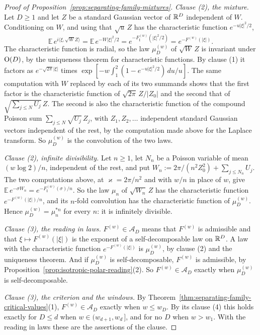 \begin{proof}[Proof of Proposition~\ref{prop:separating-family-mixtures}]
\emph{Clause (2), the mixture.} Let $D \ge 1$ and let $Z$ be a standard Gaussian vector of
$\mathbb{R}^D$ independent of $W$. Conditioning on $W$, and using that $\sqrt u\,Z$ has the
characteristic function $e^{-u|\xi|^2/2}$,
\[
  \mathbb{E}\,e^{i\langle\xi,\sqrt W Z\rangle} = \mathbb{E}\,e^{-W|\xi|^2/2}
   = e^{-F^{(w)}_{\mathrm I}(|\xi|^2/2)} = e^{-F^{(w)}(|\xi|)} .
\]
The characteristic function is radial, so the law $\mu^{(w)}_D$ of $\sqrt W\,Z$ is invariant
under $\mathrm{O}(D)$, by the uniqueness theorem for characteristic functions. By clause (1) it
factors as $e^{-\sqrt{2\pi}|\xi|}$ times
$\exp[-w\int_1^2(1 - e^{-u|\xi|^2/2})\,du/u]$. The same computation with $W$ replaced by each
of its two summands shows that the first factor is the characteristic function of
$\sqrt{2\pi}\,Z/|Z_0|$ and the second that of $\sqrt{\sum_{j\le N}U_j}\,Z$. The second is also
the characteristic function of the compound Poisson sum $\sum_{j \le N}\sqrt{U_j}\,Z_j$, with
$Z_1, Z_2, \dots$ independent standard Gaussian vectors independent of the rest, by the
computation made above for the Laplace transform. So $\mu^{(w)}_D$ is the convolution of the
two laws.

\emph{Clause (2), infinite divisibility.} Let $n \ge 1$, let $N_n$ be a Poisson variable of mean
$(w\log 2)/n$, independent of the rest, and put
$W_n := 2\pi/(n^2Z_0^2) + \sum_{j \le N_n}U_j$. The two computations above, at
$\varkappa = 2\pi/n^2$ and with $w/n$ in place of $w$, give
$\mathbb{E}\,e^{-\sigma W_n} = e^{-F^{(w)}_{\mathrm I}(\sigma)/n}$. So the law $\mu_n$ of
$\sqrt{W_n}\,Z$ has the characteristic function $e^{-F^{(w)}(|\xi|)/n}$, and its $n$-fold
convolution has the characteristic function of $\mu^{(w)}_D$. Hence
$\mu^{(w)}_D = \mu_n^{\ast n}$ for every $n$: it is infinitely divisible.

\emph{Clause (3), the reading in laws.} $F^{(w)} \in \mathcal{A}_D$ means that $F^{(w)}$ is
admissible and that $\xi \mapsto F^{(w)}(|\xi|)$ is the exponent of a self-decomposable law on
$\mathbb{R}^D$. A law with the characteristic function $e^{-F^{(w)}(|\xi|)}$ is $\mu^{(w)}_D$, by
clause (2) and the uniqueness theorem. And if $\mu^{(w)}_D$ is self-decomposable, $F^{(w)}$ is
admissible, by Proposition~\ref{prop:isotropic-polar-reading}(2). So $F^{(w)} \in \mathcal{A}_D$
exactly when $\mu^{(w)}_D$ is self-decomposable.

\emph{Clause (3), the criterion and the windows.} By
Theorem~\ref{thm:separating-family-critical-values}(1), $F^{(w)} \in \mathcal{A}_D$ exactly when
$w \le w_D$. By its clause (4) this holds exactly for $D \le d$ when $w \in (w_{d+1}, w_d\,]$,
and for no $D$ when $w > w_1$. With the reading in laws these are the assertions of the clause.
\end{proof}

